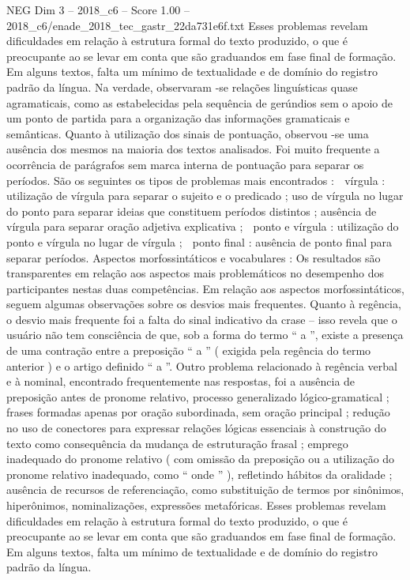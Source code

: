 \begin{textsample}{NEG Dim 3 – 2018\_c6 – Score 1.00 – 2018\_c6/enade\_2018\_tec\_gastr\_22da731e6f.txt}
Esses problemas revelam dificuldades em relação à estrutura formal do texto produzido, o que é preocupante ao se levar em conta que são graduandos em fase final de formação.
Em alguns textos, falta um mínimo de textualidade e de domínio do registro padrão da língua.
Na verdade, observaram -se relações linguísticas quase agramaticais, como as estabelecidas pela sequência de gerúndios sem o apoio de um ponto de partida para a organização das informações gramaticais e semânticas.
Quanto à utilização dos sinais de pontuação, observou -se uma ausência dos mesmos na maioria dos textos analisados.
Foi muito frequente a ocorrência de parágrafos sem marca interna de pontuação para separar os períodos.
São os seguintes os tipos de problemas mais encontrados :  vírgula : utilização de vírgula para separar o sujeito e o predicado ; uso de vírgula no lugar do ponto para separar ideias que constituem períodos distintos ; ausência de vírgula para separar oração adjetiva explicativa ;  ponto e vírgula : utilização do ponto e vírgula no lugar de vírgula ;  ponto final : ausência de ponto final para separar períodos.
Aspectos morfossintáticos e vocabulares : Os resultados são transparentes em relação aos aspectos mais problemáticos no desempenho dos participantes nestas duas competências.
Em relação aos aspectos morfossintáticos, seguem algumas observações sobre os desvios mais frequentes.
Quanto à regência, o desvio mais frequente foi a falta do sinal indicativo da crase – isso revela que o usuário não tem consciência de que, sob a forma do termo “ a ”, existe a presença de uma contração entre a preposição “ a ” ( exigida pela regência do termo anterior ) e o artigo definido “ a ”.
Outro problema relacionado à regência verbal e à nominal, encontrado frequentemente nas respostas, foi a ausência de preposição antes de pronome relativo, processo generalizado lógico-gramatical ; frases formadas apenas por oração subordinada, sem oração principal ; redução no uso de conectores para expressar relações lógicas essenciais à construção do texto como consequência da mudança de estruturação frasal ; emprego inadequado do pronome relativo ( com omissão da preposição ou a utilização do pronome relativo inadequado, como “ onde ” ), refletindo hábitos da oralidade ; ausência de recursos de referenciação, como substituição de termos por sinônimos, hiperônimos, nominalizações, expressões metafóricas.
Esses problemas revelam dificuldades em relação à estrutura formal do texto produzido, o que é preocupante ao se levar em conta que são graduandos em fase final de formação.
Em alguns textos, falta um mínimo de textualidade e de domínio do registro padrão da língua.

\end{textsample}
